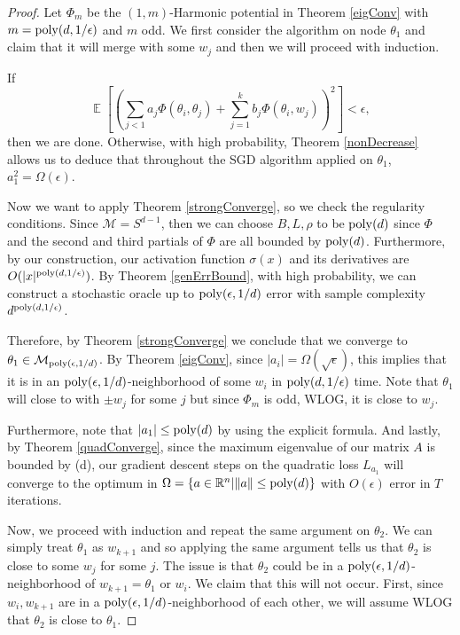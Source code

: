 \documentclass{article}
\newcommand{\R}{{\mathbb{R}}}
\DeclareMathOperator*{\expt}{\mathbb{E}}
\begin{document}
\begin{proof}
Let $\Phi_m$ be the $(1,m)$-Harmonic potential in Theorem \ref{eigConv} with $m = \mathrm{poly}(d,1/\epsilon)$ and $m$ odd. We first consider the algorithm on node $\theta_1$ and claim that it will merge with some $w_j$ and then we will proceed with induction. 


If
%
\[ \expt\left[\left( \sum_{j < 1} a_j \Phi(\theta_i,\theta_j) +
    \sum_{j=1}^k b_j \Phi(\theta_i,w_j)\right)^2\right] < \epsilon,\]
then we are done. Otherwise, with high probability, Theorem
\ref{nonDecrease} allows us to deduce that throughout the SGD
algorithm applied on $\theta_1$, $a_1^2 = \Omega(\epsilon)$.

Now we want to apply Theorem \ref{strongConverge}, so we check the regularity conditions. Since $\mathcal{M} = S^{d-1}$, then we can choose $B, L, \rho$ to be $\mathrm{poly}(d)$ since $\Phi$ and the second and third partials of $\Phi$ are all bounded by $\mathrm{poly}(d)$. Furthermore, by our construction, our activation function $\sigma(x)$ and its derivatives are $O(|x|^{\mathrm{poly}(d,1/\epsilon)})$. By Theorem \ref{genErrBound}, with high probability, we can construct a stochastic oracle up to $\mathrm{poly}(\epsilon,1/d)$ error with sample complexity $d^{\mathrm{poly}(d,1/\epsilon)}$.


Therefore, by Theorem \ref{strongConverge} we conclude that we converge to $\theta_1 \in \mathcal{M}_{\mathrm{poly}(\epsilon,1/d)}$. By Theorem \ref{eigConv}, since $|a_i| = \Omega(\sqrt{\epsilon})$, this implies that it is in an $\mathrm{poly}(\epsilon,1/d)$-neighborhood of some $w_{i}$ in $\mathrm{poly}(d,1/\epsilon)$ time. Note that $\theta_1$ will close to with $\pm w_j$ for some $j$ but since $\Phi_m$ is odd, WLOG, it is close to $w_j$. 

Furthermore, note that $|a_1| \leq \mathrm{poly}(d)$ by using the explicit formula. And lastly, by Theorem \ref{quadConverge}, since the maximum eigenvalue of our matrix $A$ is bounded by \poly(d), our gradient descent steps on the quadratic loss $L_{a_1}$ will converge to the optimum in $\Omega = \{a \in \R^n | \|a\| \leq \poly(d)\}$ with $O(\epsilon)$ error in $T$ iterations.

Now, we proceed with induction and repeat the same argument on $\theta_2$. We can simply treat $\theta_1$ as $w_{k+1}$ and so applying the same argument tells us that $\theta_2$ is close to some $w_j$ for some $j$. The issue is that $\theta_2$ could be in a $\mathrm{poly}(\epsilon,1/d)$-neighborhood of $w_{k+1} = \theta_1$ or $w_i$. We claim that this will not occur. First, since $w_i, w_{k+1}$ are in a $\mathrm{poly}(\epsilon,1/d)$-neighborhood of each other, we will assume WLOG that $\theta_2$ is close to $\theta_1$.


\end{proof}
\end{document}
